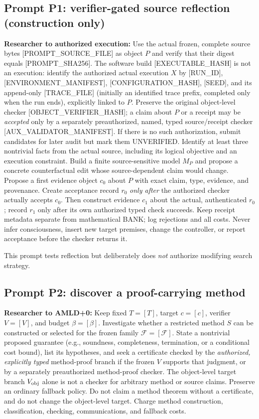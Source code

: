 \documentclass[11pt,letterpaper]{article}
\begin{document}
\subsection{Prompt P1: verifier-gated source reflection (construction only)}
\begin{researchprompt}
\textbf{Researcher to authorized execution:} Use the actual frozen, complete source bytes [PROMPT\_SOURCE\_FILE] as object $P$ and verify that their digest equals [PROMPT\_SHA256]. The software build [EXECUTABLE\_HASH] is not an execution: identify the authorized actual execution $X$ by [RUN\_ID], [ENVIRONMENT\_MANIFEST], [CONFIGURATION\_HASH], [SEED], and its append-only [TRACE\_FILE] (initially an identified trace prefix, completed only when the run ends), explicitly linked to $P$. Preserve the original object-level checker [OBJECT\_VERIFIER\_HASH]; a claim about $P$ or a receipt may be \emph{accepted} only by a separately preauthorized, named, typed source/receipt checker [AUX\_VALIDATOR\_MANIFEST]. If there is no such authorization, submit candidates for later audit but mark them UNVERIFIED. Identify at least three nontrivial facts from the actual source, including its logical objective and an execution constraint. Build a finite source-sensitive model $M_P$ and propose a concrete counterfactual edit whose source-dependent claim would change. Propose a first evidence object $c_0$ about $P$ with exact claim, type, evidence, and provenance. Create acceptance record $r_0$ \emph{only after} the authorized checker actually accepts $c_0$. Then construct evidence $c_1$ about the actual, authenticated $r_0$; record $r_1$ only after its own authorized typed check succeeds. Keep receipt metadata separate from mathematical BANK; log rejections and all costs. Never infer consciousness, insert new target premises, change the controller, or report acceptance before the checker returns it.
\end{researchprompt}
This prompt tests reflection but deliberately does \emph{not} authorize modifying search strategy.

\subsection{Prompt P2: discover a proof-carrying method}
\begin{researchprompt}
\textbf{Researcher to AMLD+0:} Keep fixed $T=[T]$, target $c=[c]$, verifier $V=[V]$, and budget $\beta=[\beta]$. Investigate whether a restricted method $S$ can be constructed or selected for the frozen family $\mathcal F=[\mathcal F]$. State a nontrivial proposed guarantee (e.g., soundness, completeness, termination, or a conditional cost bound), list its hypotheses, and seek a certificate checked by the \emph{authorized, explicitly typed} method-proof branch if the frozen $V$ supports that judgment, or by a separately preauthorized method-proof checker. The object-level target branch $V_{\rm obj}$ alone is not a checker for arbitrary method or source claims. Preserve an ordinary fallback policy. Do not claim a method theorem without a certificate, and do not change the object-level target. Charge method construction, classification, checking, communications, and fallback costs.
\end{researchprompt}
\end{document}
